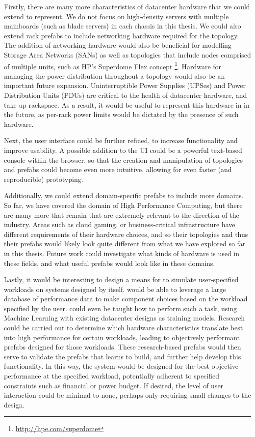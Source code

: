\documentclass[11pt]{article}
\begin{document}
	Firstly, there are many more characteristics of datacenter hardware that we could extend \opendc{} to represent. 
	We do not focus on high-density servers with multiple mainboards (such as blade servers) in each chassis in this thesis. 
	We could also extend rack prefabs to include networking hardware required for the topology. 
	The addition of networking hardware would also be beneficial for modelling Storage Area Networks (SANs) as well as topologies that include nodes comprised of multiple units, such as HP's Superdome Flex concept \footnote{\url{http://hpe.com/superdome}}.
	Hardware for managing the power distribution throughout a topology would also be an important future expansion.
	Uninterruptible Power Supplies (UPSes) and Power Distribution Units (PDUs) are critical to the health of datacenter hardware, and take up rackspace.
	As a result, it would be useful to represent this hardware in \opendc{} in the future, as per-rack power limits would be dictated by the presence of such hardware.

	Next, the \opendc{} user interface could be further refined, to increase functionality and improve usability.
	A possible addition to the UI could be a powerful text-based console within the browser, so that the creation and manipulation of topologies and prefabs could become even more intuitive, allowing for even faster (and reproducible) prototyping.

	Additionally, we could extend domain-specific prefabs to include more domains.
	So far, we have covered the domain of High Performance Computing, but there are many more that remain that are extremely relevant to the direction of the industry.
	Areas such as cloud gaming, or business-critical infrastructure have different requirements of their hardware choices, and so their topologies and thus their prefabs would likely look quite different from what we have explored so far in this thesis.
	Future work could investigate what kinds of hardware is used in these fields, and what useful prefabs would look like in these domains.

	Lastly, it would be interesting to design a means for \opendc{} to simulate user-specified workloads on systems designed by \opendc{} itself. 
	\opendc{} would be able to leverage a large database of performance data to make component choices based on the workload specified by the user. 
	\opendc{} could even be taught how to perform such a task, using Machine Learning with existing datacenter designs as training models.
	Research could be carried out to determine which hardware characteristics translate best into high performance for certain workloads, leading to objectively performant prefabs designed for those workloads.
	These research-based prefabs would then serve to validate the prefabs that \opendc{} learns to build, and further help develop this functionality.
	In this way, the system would be designed for the best objective performance at the specified workload, potentially adherent to specified constraints such as financial or power budget.
	If desired, the level of user interaction could be minimal to none, perhaps only requiring small changes to the design.







\newpage


\end{document}
